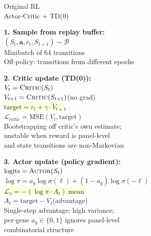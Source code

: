 \documentclass[8pt]{article}
\newlength{\colw}
\begin{document}
\noindent
\begin{minipage}[t]{\colw}
\begin{tcolorbox}[colback=hdrA, colframe=hdrA, fontupper=\bfseries\footnotesize\color{white},
    arc=2pt, left=2pt, right=2pt, top=1pt, bottom=1pt]
\centering Original RL\\[-2pt]
{\scriptsize\mdseries Actor-Critic + TD(0)}
\end{tcolorbox}
\vspace{1pt}

\begin{warnbox}
\textbf{1. Sample from replay buffer:}\\
$(S_t, \mathbf{a}, r_t, S_{t+1}) \sim \mathcal{B}$\\
Minibatch of 64 transitions\\
{\scriptsize Off-policy: transitions from different epochs}
\end{warnbox}\vspace{1pt}

\begin{warnbox}
\textbf{2. Critic update (TD(0)):}\\
$V_t = \textsc{Critic}(S_t)$\\
$V_{t+1} = \textsc{Critic}(S_{t+1})$\quad(no grad)\\
\colorbox{lightyellow}{$\text{target} = r_t + \gamma \cdot V_{t+1}$}\\
$\mathcal{L}_\text{critic} = \text{MSE}(V_t, \text{target})$\\
{\scriptsize\color{removed} Bootstrapping off critic's own estimate;\\
unstable when reward is panel-level\\
and state transitions are non-Markovian}
\end{warnbox}\vspace{1pt}

\begin{warnbox}
\textbf{3. Actor update (policy gradient):}\\
$\text{logits} = \textsc{Actor}(S_t)$\\
$\log\pi = a_g \log\sigma(\ell) + (1{-}a_g)\log\sigma({-}\ell)$\\
\colorbox{lightyellow}{$\mathcal{L}_\pi = -(\log\pi \cdot A_t).\text{mean}$}\\
$A_t = \text{target} - V_t$\quad(advantage)\\
{\scriptsize\color{removed} Single-step advantage; high variance;\\
per-gene $a_g \in \{0,1\}$ ignores panel-level\\
combinatorial structure}
\end{warnbox}\vspace{1pt}


\end{minipage}
\end{document}
